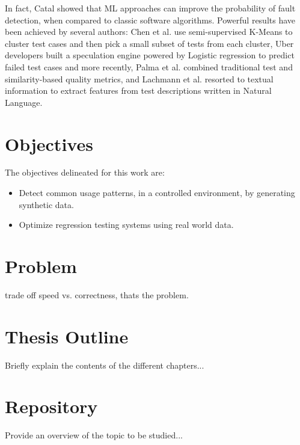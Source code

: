 In fact, Catal \cite{catal} showed that ML approaches can improve the probability of fault detection, when compared to classic software algorithms. 
Powerful results have been achieved by several authors: Chen et al. \cite{chen} use semi-supervised K-Means to cluster test cases and then pick a small subset of tests from each cluster, Uber developers \cite{Uber} built a speculation engine powered by Logistic regression to predict failed test cases and more recently, Palma et al. \cite{palma} combined traditional test and similarity-based quality metrics, and Lachmann et al. \cite{lachmannlp} resorted to textual information to extract features from test descriptions written in Natural Language.
 




\section{Objectives}
\label{section:objectives}
The objectives delineated for this work are:
\begin{itemize}
	\item Detect common usage patterns, in a controlled environment, by generating synthetic data.
	\item Optimize regression testing systems using real world data.
\end{itemize}



\section{Problem}
\label{section:repository}

trade off speed vs. correctness, thats the problem.

\section{Thesis Outline}
\label{section:outline}

Briefly explain the contents of the different chapters...



\section{Repository}
\label{section:repository}

Provide an overview of the topic to be studied...